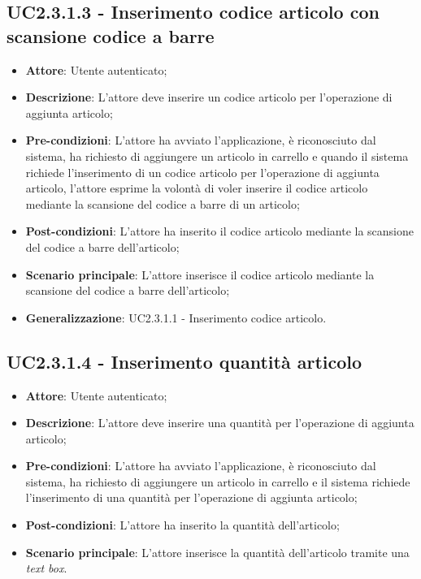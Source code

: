 \subsection{UC2.3.1.3 - Inserimento codice articolo con scansione codice a barre}

\begin{itemize}
	\item \textbf{Attore}: Utente autenticato;
	\item \textbf{Descrizione}: L'attore deve inserire un codice articolo per l'operazione di aggiunta articolo;
	\item \textbf{Pre-condizioni}: L'attore ha avviato l'applicazione, è riconosciuto dal sistema, ha richiesto di aggiungere un articolo in carrello e quando il sistema richiede l'inserimento di un codice articolo per l'operazione di aggiunta articolo, l'attore esprime la volontà di voler inserire il codice articolo mediante la scansione del codice a barre di un articolo;
	\item \textbf{Post-condizioni}: L'attore ha inserito il codice articolo mediante la scansione del codice a barre dell'articolo;
	\item \textbf{Scenario principale}: L'attore inserisce il codice articolo mediante la scansione del codice a barre dell'articolo;
	\item \textbf{Generalizzazione}: UC2.3.1.1 - Inserimento codice articolo.
\end{itemize}

\subsection{UC2.3.1.4 - Inserimento quantità articolo}

\begin{itemize}
	\item \textbf{Attore}: Utente autenticato;
	\item \textbf{Descrizione}: L'attore deve inserire una quantità per l'operazione di aggiunta articolo;
	\item \textbf{Pre-condizioni}: L'attore ha avviato l'applicazione, è riconosciuto dal sistema, ha richiesto di aggiungere un articolo in carrello e il sistema richiede l'inserimento di una quantità per l'operazione di aggiunta articolo;
	\item \textbf{Post-condizioni}: L'attore ha inserito la quantità dell'articolo;
	\item \textbf{Scenario principale}: L'attore inserisce la quantità dell'articolo tramite una \textit{text box}.
\end{itemize}

